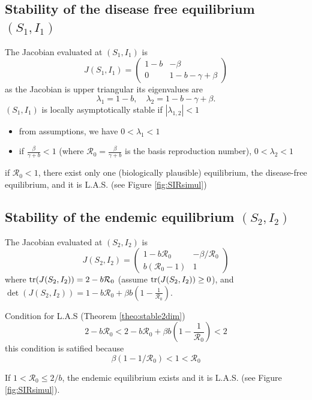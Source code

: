 \subsection{Stability of the disease free equilibrium $(S_1,I_1)$}
The Jacobian evaluated at $(S_1,I_1)$ is
$$
J(S_1,I_1)=\left (
\begin{array}{cc}
1-b & -\beta \\
0 & 1-b-\gamma +\beta 
\end{array}
\right )
$$
as the Jacobian is upper triangular its eigenvalues are
$$\lambda _1 = 1-b , \quad \lambda _2= 1-b-\gamma +\beta  .$$
$(S_1,I_1)$ is locally asymptotically stable if $|\lambda_{1,2}|<1$
\begin{itemize}
\item from assumptions, we have $0<\lambda _1 <1$
\item if $\frac{\beta}{\gamma +b}<1$ (where $\mathcal{R}_0=\frac{\beta}{\gamma +b}$ is the basis reproduction number), $0<\lambda _2 <1$
\end{itemize}
if $\mathcal{R}_0 <1$, there exist only one (biologically plausible) equilibrium, the disease-free equilibrium, and it is L.A.S. (see Figure \ref{fig:SIRsimul})


\subsection{Stability of the endemic equilibrium $(S_2,I_2)$}
The Jacobian evaluated at $(S_2,I_2)$ is
$$
J(S_2,I_2)=\left (
\begin{array}{cc}
1-b\mathcal{R}_0 & -\beta/\mathcal{R}_0 \\
b(\mathcal{R}_0-1) & 1
\end{array}
\right )
$$
where $\textrm{tr}(J(S_2,I_2))=2-b\mathcal{R}_0 $ (assume $ \textrm{tr}(J(S_2,I_2))\geq 0$), and $\det(J(S_2,I_2))=1-b\mathcal{R}_0+\beta b (1-\frac{1}{\mathcal{R}_0})$.


Condition for L.A.S (Theorem \ref{theo:stable2dim})
$$2-b\mathcal{R}_0 <2-b\mathcal{R}_0+\beta b (1-\frac{1}{\mathcal{R}_0}) <2$$
this condition is satified because
$$\beta (1-1/\mathcal{R}_0)<1<\mathcal{R}_0$$

If $1<\mathcal{R_0}\leq 2/b$, the endemic equilibrium  exists and it is L.A.S. (see Figure \ref{fig:SIRsimul}).



